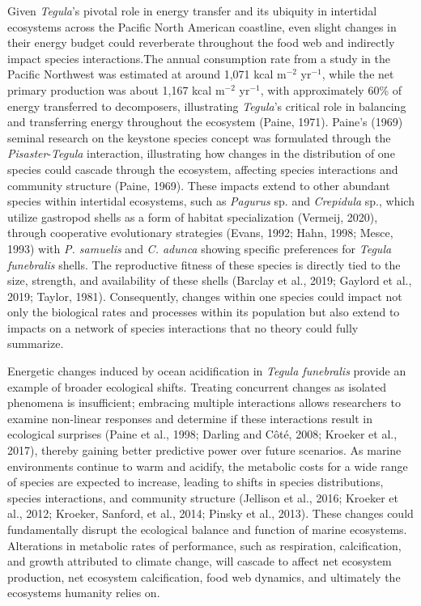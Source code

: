 \documentclass{CSUNthesis}
\begin{document}
Given \textit{Tegula}'s pivotal role in energy transfer and its ubiquity in intertidal ecosystems across the Pacific North American coastline, even slight changes in their energy budget could reverberate throughout the food web and indirectly impact species interactions.The annual consumption rate from a study in the Pacific Northwest was estimated at around 1,071 kcal m\(^{-2}\) yr\(^{-1}\), while the net primary production was about 1,167 kcal m\(^{-2}\) yr\(^{-1}\), with approximately 60\% of energy transferred to decomposers, illustrating \textit{Tegula}'s critical role in balancing and transferring energy throughout the ecosystem (Paine, 1971). Paine's (1969) seminal research on the keystone species concept was formulated through the \textit{Pisaster}-\textit{Tegula} interaction, illustrating how changes in the distribution of one species could cascade through the ecosystem, affecting species interactions and community structure (Paine, 1969). These impacts extend to other abundant species within intertidal ecosystems, such as \textit{Pagurus} sp. and \textit{Crepidula} sp., which utilize gastropod shells as a form of habitat specialization (Vermeij, 2020), through cooperative evolutionary strategies (Evans, 1992; Hahn, 1998; Mesce, 1993) with \textit{P. samuelis} and \textit{C. adunca} showing specific preferences for \textit{Tegula funebralis} shells. The reproductive fitness of these species is directly tied to the size, strength, and availability of these shells (Barclay et al., 2019; Gaylord et al., 2019; Taylor, 1981). Consequently, changes within one species could impact not only the biological rates and processes within its population but also extend to impacts on a network of species interactions that no theory could fully summarize.

Energetic changes induced by ocean acidification in \textit{Tegula funebralis} provide an example of broader ecological shifts. Treating concurrent changes as isolated phenomena is insufficient; embracing multiple interactions allows researchers to examine non-linear responses and determine if these interactions result in ecological surprises (Paine et al., 1998; Darling and Côté, 2008; Kroeker et al., 2017), thereby gaining better predictive power over future scenarios. As marine environments continue to warm and acidify, the metabolic costs for a wide range of species are expected to increase, leading to shifts in species distributions, species interactions, and community structure (Jellison et al., 2016; Kroeker et al., 2012; Kroeker, Sanford, et al., 2014; Pinsky et al., 2013). These changes could fundamentally disrupt the ecological balance and function of marine ecosystems. Alterations in metabolic rates of performance, such as respiration, calcification, and growth attributed to climate change, will cascade to affect net ecosystem production, net ecosystem calcification, food web dynamics, and ultimately the ecosystems humanity relies on.
\end{document}
